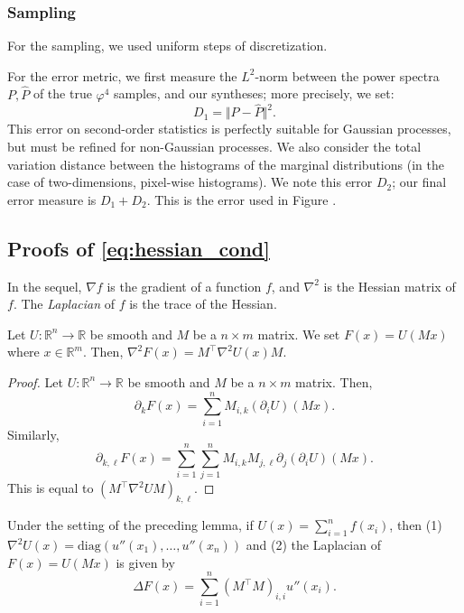 \documentclass{article}
\begin{document}
\subsubsection*{Sampling}

For the sampling, we used uniform steps of discretization. %

For the error metric, we first measure the $L^2$-norm between the power spectra $P, \hat{P}$ of the true $\varphi^4$ samples, and our syntheses; more precisely, we set: 
$$ D_1 = \Vert P - \hat{P}\Vert^2.$$
This error on second-order statistics is perfectly suitable for Gaussian processes, but must be refined for non-Gaussian processes. We also consider the total variation distance between the histograms of the marginal distributions (in the case of two-dimensions, pixel-wise histograms). We note this error $D_2$; our final error measure is $D_1 + D_2$. This is the error used in Figure . 

\subsection{Proofs of \eqref{eq:hessian_cond}}


In the sequel, $\nabla f$ is the gradient of a function $f$, and $\nabla^2$ is the Hessian matrix of $f$. The \emph{Laplacian} of $f$ is the trace of the Hessian. 

\begin{lemma}
Let $U:\mathbb{R}^n \to \mathbb{R}$ be smooth and $M$ be a $n\times m$ matrix. We set $F(x) = U(Mx)$ where $x\in \mathbb{R}^m$. Then, $\nabla^2 F(x) = M^\top \nabla^2 U(x) M$. 
\end{lemma}
\begin{proof}
  Let $U:\mathbb{R}^n \to \mathbb{R}$ be smooth and $M$ be a $n\times m$ matrix. Then, $$\partial_k F(x) = \sum_{i=1}^n M_{i,k} (\partial_i U)(Mx).$$ Similarly,  
  \begin{equation}\label{p:partialij}\partial_{k,\ell}F(x) = \sum_{i=1}^n \sum_{j=1}^n M_{i,k}M_{j,\ell}\partial_{j}(\partial_iU)(Mx).\end{equation}
  This is equal to $(M^\top \nabla^2U M)_{k,\ell}$. 
\end{proof}

\begin{lemma}Under the setting of the preceding lemma, if $U(x) = \sum_{i=1}^n f(x_i)$, then (1) $\nabla^2 U(x) = \mathrm{diag}(u''(x_1), \dotsc, u''(x_n))$ and (2) the Laplacian of $F(x) = U(Mx)$ is given by 
$$ \Delta F(x) = \sum_{i=1}^n (M^\top M)_{i,i}u''(x_i). $$
\end{lemma}
\end{document}
